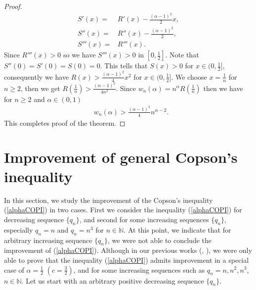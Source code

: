 \documentclass[12pt]{amsart}
\theoremstyle{definition}
\theoremstyle{plain}
\theoremstyle{definition}
\numberwithin{equation}{section}
\begin{document}
\begin{proof}
\begin{align*}
S'(x)=&R'(x)-\frac{(\alpha-1)^2}{2}x,\\
S''(x)=&R''(x)-\frac{(\alpha-1)^2}{2},\\
S'''(x)=&R'''(x).
\end{align*}
Since $R'''(x)>0$ so we have $S'''(x)>0$ in $[0, \frac{1}{2}]$. Note that $S''(0)=S'(0)=S(0)=0$. This tells that $S(x)>0$ for $x\in(0, \frac{1}{2}]$, consequently we have $R(x)>\frac{(\alpha-1)^2}{4}x^{2}$ for $x\in(0, \frac{1}{2}]$. We choose $x=\frac{1}{n}$ for $n\geq 2$, then we get $R(\frac{1}{n})>\frac{(\alpha-1)^2}{4n^{2}}$. Since $w_{n}(\alpha)=n^{\alpha}R(\frac{1}{n})$ then we have for $n\geq 2$ and $\alpha\in(0, 1)$
\begin{align*}
&w_{n}(\alpha)>\frac{(\alpha-1)^2}{4}{n}^{\alpha-2}.
\end{align*}
This completes proof of the theorem.
\end{proof}

\section{Improvement of general Copson's inequality}
In this section, we study the improvement of the Copson's inequality (\ref{alphaCOPI}) in two cases. First we consider the inequality (\ref{alphaCOPI}) for decreasing sequence $\{q_n\}$, and second for some increasing sequences $\{q_n\}$, especially $q_n=n$ and $q_n=n^3$ for $n\in \mathbb{N}$. At this point, we indicate that for arbitrary increasing sequence $\{q_n\}$, we were not able to conclude the improvement of (\ref{alphaCOPI}). Although in our previous works (\cite{DASMAN}, \cite{DASMAN2}), we were only able to prove that the inequality (\ref{alphaCOPI}) admits improvement in a special case of $\alpha=\frac{1}{2}$ $(c=\frac{3}{2})$, and for some increasing sequences such as $q_n=n, n^2, n^3$, $n\in \mathbb{N}$. Let us start with an arbitrary positive decreasing sequence $\{q_n\}$.
\end{document}
